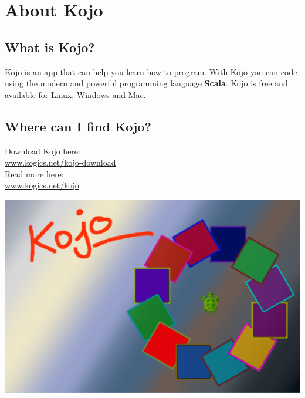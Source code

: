 \chapter{About Kojo}
\begin{multicols}{2}
\section*{\color{black}What is Kojo?}
Kojo is an app that can help you learn how to program. With Kojo you can code using the modern and powerful programming language {\bf\color{blue}Scala}. Kojo is free and available for Linux, Windows and Mac.
\section*{\color{black}Where can I find Kojo?}
Download Kojo here: 
\\

\href{http://www.kogics.net/kojo-download}{www.kogics.net/kojo-download}
\\

Read more here: 
\\

\href{http://www.kogics.net/kojo}{www.kogics.net/kojo}

\columnbreak

\begin{center}
\includegraphics[width=14.0cm]{../img/kojo.png}
\end{center}

\end{multicols}

